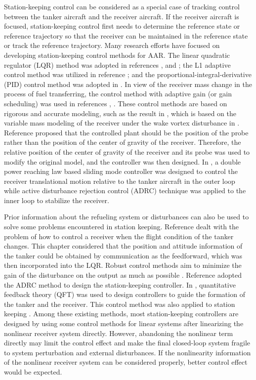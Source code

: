 Station-keeping control can be considered as a special case of tracking
control between the tanker aircraft and the receiver aircraft. If the
receiver aircraft is focused, station-keeping control first needs to
determine the reference state or reference trajectory so that the receiver
can be maintained in the reference state or track the reference trajectory.
Many research efforts have focused on developing station-keeping control
methods for AAR. The linear quadratic regulator (LQR) method was adopted in
references \cite{dogan2009effects}, \cite{elliott2009improving} and \cite%
{lee2013estimation}; the L1 adaptive control method was utilized in
reference \cite{wang2010verifiable}; and the
proportional-integral-derivative (PID) control method was adopted in \cite%
{ross2006autonomous}. In view of the receiver mass change in the process of
fuel transferring, the control method with adaptive gain (or gain
scheduling) was used in references \cite{dogan2009effects}, \cite%
{wang2010verifiable}. These control methods are based on rigorous and
accurate modeling, such as the result in \cite{dogan2009effects}, which is
based on the variable mass modeling of the receiver under the wake vortex
disturbance in \cite{Waishek2009Derivation}. Reference \cite%
{kriel2013receptacle} proposed that the controlled plant should be the
position of the probe rather than the position of the center of gravity of
the receiver. Therefore, the relative position of the center of gravity of
the receiver and its probe was used to modify the original model, and the
controller was then designed. In \cite{an2018relative}, a double power
reaching law based sliding mode controller was designed to control the
receiver translational motion relative to the tanker aircraft in the outer
loop while active disturbance rejection control (ADRC) technique
\cite{yuan2019position} was applied to the inner loop to stabilize the receiver.

Prior information about the refueling system or disturbances can also be
used to solve some problems encountered in station keeping. Reference \cite%
{elliott2009improving} dealt with the problem of how to control a receiver
when the flight condition of the tanker changes. This chapter considered that
the position and attitude information of the tanker could be obtained by
communication as the feedforward, which was then incorporated into the LQR.
Robust control methods aim to minimize the gain of the disturbance on the
output as much as possible \cite{rehan2012robust}. Reference \cite%
{sun2013uav} adopted the ADRC method to design the station-keeping
controller. In \cite{pachter1997design}, quantitative feedback theory (QFT)
was used to design controllers to guide the formation of the tanker and the
receiver. This control method was also applied to station keeping \cite%
{guo2010design}. Among these existing methods, most station-keeping
controllers are designed by using some control methods for linear systems
after linearizing the nonlinear receiver system directly. However,
abandoning the nonlinear term directly may limit the control effect and make
the final closed-loop system fragile to system perturbation and external
disturbances. If the nonlinearity information of the nonlinear receiver
system can be considered properly, better control effect would be expected.

